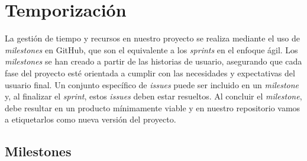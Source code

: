 \section{Temporización}

La gestión de tiempo y recursos en nuestro proyecto se realiza mediante el uso de \textit{milestones} en GitHub, que son el equivalente a los \textit{sprints} en el enfoque ágil. Los \textit{milestones} se han creado a partir de las historias de usuario, asegurando que cada fase del proyecto esté orientada a cumplir con las necesidades y expectativas del usuario final. Un conjunto específico de \textit{issues} puede ser incluido en un \textit{milestone} y, al finalizar el \textit{sprint}, estos \textit{issues} deben estar resueltos. Al concluir el \textit{milestone}, debe resultar en un producto mínimamente viable y en nuestro repositorio vamos a etiquetarlos como nueva versión del proyecto.

\subsection{Milestones}

